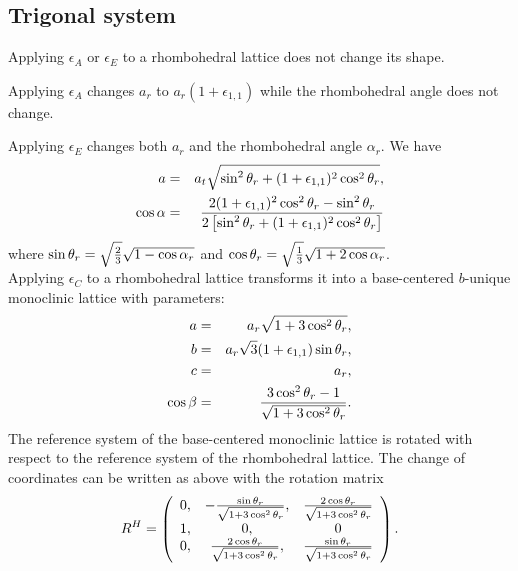 \documentclass[12pt,a4paper,twoside]{report}
\begin{document}
{\color{web-blue}\subsection{Trigonal system}}
\color{black}

Applying $\epsilon_A$ or $\epsilon_E$ to a rhombohedral lattice does
not change its shape. 

Applying $\epsilon_A$ changes $a_r$ to $a_r (1+\epsilon_{1,1})$ while the
rhombohedral angle does not change.

Applying $\epsilon_E$ changes both $a_r$ and the rhombohedral angle
$\alpha_r$. We have 
\begin{eqnarray}
a&=&a_t \sqrt{\sin^2\theta_r + (1 + \epsilon_{1,1})^2 \cos^2\theta_r}, \\
\cos\alpha &=& {
2(1 + \epsilon_{1,1})^2 \cos^2\theta_r -\sin^2\theta_r  \over
2 \left[\sin^2\theta_r+ (1 + \epsilon_{1,1})^2 \cos^2\theta_r\right]}
\end{eqnarray}
where 
$\sin{\theta_r}=\sqrt{2\over 3}\sqrt{1-\cos{\alpha_r}}$
and $\cos{\theta_r}=\sqrt{1\over 3}\sqrt{1 + 2 \cos{\alpha_r}}$. \\

Applying $\epsilon_C$ to a rhombohedral lattice transforms it into a
base-centered $b$-unique monoclinic lattice with parameters:
\begin{eqnarray}
a&=&a_r \sqrt{1 + 3 \cos^2 \theta_r}, \\
b&=&a_r \sqrt{3} (1 + \epsilon_{1,1}) \sin \theta_r, \\
c&=&a_r, \\
\cos\beta &=& {3 \cos^2 \theta_r -1 \over \sqrt{1 + 3 \cos^2 \theta_r} }.
\end{eqnarray}
The reference system of the base-centered monoclinic lattice is rotated 
with respect to the reference system of the rhombohedral lattice.
The change of coordinates can be written as above with the rotation matrix 
\begin{equation}
R^H=\left( \begin{array}{ccc}
0, & -{\sin\theta_r \over \sqrt{1 + 3 \cos^2 \theta_r}}, &  {2\cos\theta_r \over \sqrt{1 + 3 \cos^2 \theta_r}}\\
1, & 0, & 0  
\\
0, & {2\cos\theta_r \over \sqrt{1 + 3 \cos^2 \theta_r}}, & 
{\sin\theta_r \over \sqrt{1 + 3 \cos^2 \theta_r}} 
\end{array}
\right).
\end{equation}
\end{document}
